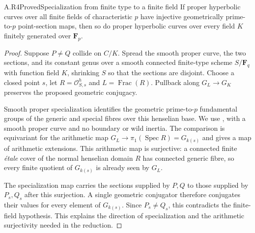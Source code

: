 \begin{claim}{A.R4}{Proved}{Specialization from finite type to a finite field}
If proper hyperbolic curves over all finite fields of characteristic
$p$ have injective geometrically prime-to-$p$ point-section maps,
then so do proper hyperbolic curves over every field $K$ finitely
generated over $\mathbf F_p$.
\end{claim}
\begin{proof}
Suppose $P\ne Q$ collide on $C/K$. Spread the smooth proper curve,
the two sections, and its constant genus over a smooth connected
finite-type scheme $S/\mathbf F_q$ with function field $K$, shrinking
$S$ so that the sections are disjoint. Choose a closed point $s$,
let $R=\mathcal O^h_{S,s}$ and $L=\operatorname{Frac}(R)$. Pullback
along $G_L\to G_K$ preserves the proposed geometric conjugacy.

Smooth proper specialization identifies the geometric prime-to-$p$
fundamental groups of the generic and special fibres over this
henselian base. We use \cite[Expos\'e X, Corollary 3.9, and
Expos\'e XIII, Corollaries 2.9--2.10]{SGA1}, with a smooth proper
curve and no boundary or wild inertia. The comparison is equivariant
for the arithmetic map
$G_L\to\pi_1(\operatorname{Spec}R)=G_{k(s)}$ and gives a map of
arithmetic extensions. This arithmetic map is surjective: a connected
finite \emph{\'etale} cover of the normal henselian domain $R$ has
connected generic fibre, so every finite quotient of $G_{k(s)}$
is already seen by $G_L$.

The specialization map carries the sections supplied by $P,Q$ to
those supplied by $P_s,Q_s$ after this surjection. A single geometric
conjugator therefore conjugates their values for every element of
$G_{k(s)}$. Since $P_s\ne Q_s$, this contradicts the finite-field
hypothesis. This explains the direction of specialization and the
arithmetic surjectivity needed in the reduction.
\end{proof}

